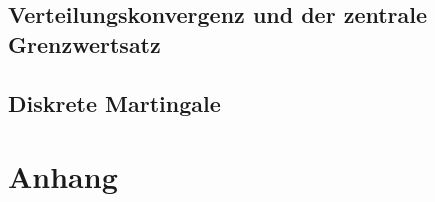 \documentclass[ngerman,a4paper,order=firstname]{local_mathscript} %
\begin{document}
\chapter{Verteilungskonvergenz und der zentrale Grenzwertsatz}


\chapter{Diskrete Martingale}


\part*{Anhang}
\appendix

\nocite{*}




\printindex
\end{document}
